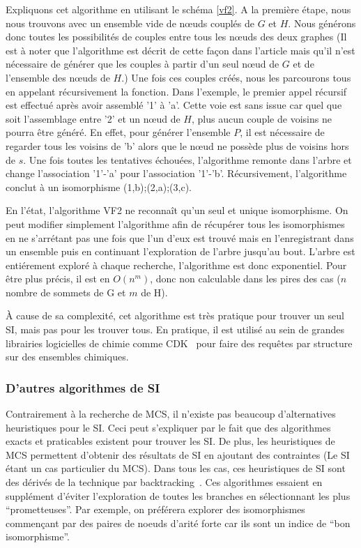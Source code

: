 Expliquons cet algorithme en utilisant le schéma \ref{vf2}.
A la première étape, nous nous trouvons avec un ensemble vide de n\oe{}uds couplés de $G$ et $H$.
Nous générons donc toutes les possibilités de couples entre tous les n\oe{}uds des deux graphes (Il est à noter que l'algorithme
est décrit de cette façon dans l'article mais qu'il n'est nécessaire de générer que les couples à partir d'un seul n\oe{}ud de $G$
et de l'ensemble des n\oe{}uds de $H$.)
Une fois ces couples créés, nous les parcourons tous en appelant récursivement la fonction.
Dans l'exemple, le premier appel récursif est effectué après avoir assemblé '1' à 'a'.
Cette voie est sans issue car quel que soit l'assemblage entre '2' et un n\oe{}ud de $H$, plus aucun couple de voisins ne pourra être
généré.
En effet, pour générer l'ensemble $P$, il est nécessaire de regarder tous les voisins de 'b' alors que le n\oe{}ud ne possède plus
de voisins hors de $s$.
Une fois toutes les tentatives échouées, l'algorithme remonte dans l'arbre et change l'association '1'-'a' pour l'association
'1'-'b'.
Récursivement, l'algorithme conclut à un isomorphisme {(1,b);(2,a);(3,c)}.

En l'état, l'algorithme VF2 ne reconnaît qu'un seul et unique isomorphisme.
On peut modifier simplement l'algorithme afin de récupérer tous les isomorphismes en ne s'arrétant pas une fois que l'un d'eux est
trouvé mais en l'enregistrant dans un ensemble puis en continuant l'exploration de l'arbre jusqu'au bout.
L'arbre est entiérement exploré à chaque recherche, l'algorithme est donc exponentiel.
Pour être plus précis, il est en $O(n^m)$, donc non calculable dans les pires des cas ($n$ nombre de sommets de G et $m$ de H).

À cause de sa complexité, cet algorithme est très pratique pour trouver un seul SI, mais pas pour les trouver tous.
En pratique, il est utilisé au sein de grandes librairies logicielles de chimie comme CDK~\cite{steinbeck_chemistry_2003} pour faire des requêtes par structure sur des ensembles chimiques.


\subsubsection{D'autres algorithmes de SI}

Contrairement à la recherche de MCS, il n'existe pas beaucoup d'alternatives heuristiques pour le SI.
Ceci peut s'expliquer par le fait que des algorithmes exacts et praticables existent pour trouver les SI.
De plus, les heuristiques de MCS permettent d'obtenir des résultats de SI en ajoutant des contraintes (Le SI étant un cas particulier du MCS).
Dans tous les cas, ces heuristiques de SI sont des dérivés de la technique par backtracking~\cite{kaijar_developing_2012}.
Ces algorithmes essaient en supplément d'éviter l'exploration de toutes les branches en sélectionnant les plus ``prometteuses''.
Par exemple, on préférera explorer des isomorphismes commençant par des paires de noeuds d'arité forte car ils sont un indice de ``bon isomorphisme''.

